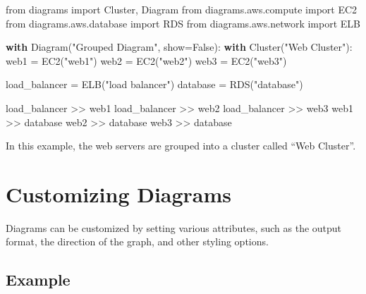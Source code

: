 \documentclass[
  letterpaper,
  DIV=11,
  numbers=noendperiod]{scrreprt}
\newenvironment{Shaded}{\begin{snugshade}}{\end{snugshade}}
\newcommand{\ControlFlowTok}[1]{\textcolor[rgb]{0.00,0.23,0.31}{\textbf{#1}}}
\newcommand{\ImportTok}[1]{\textcolor[rgb]{0.00,0.46,0.62}{#1}}
\newcommand{\NormalTok}[1]{\textcolor[rgb]{0.00,0.23,0.31}{#1}}
\newcommand{\OperatorTok}[1]{\textcolor[rgb]{0.37,0.37,0.37}{#1}}
\newcommand{\StringTok}[1]{\textcolor[rgb]{0.13,0.47,0.30}{#1}}
\newcommand{\VariableTok}[1]{\textcolor[rgb]{0.07,0.07,0.07}{#1}}
\begin{document}
\begin{Shaded}
\begin{Highlighting}[]
\ImportTok{from}\NormalTok{ diagrams }\ImportTok{import}\NormalTok{ Cluster, Diagram}
\ImportTok{from}\NormalTok{ diagrams.aws.compute }\ImportTok{import}\NormalTok{ EC2}
\ImportTok{from}\NormalTok{ diagrams.aws.database }\ImportTok{import}\NormalTok{ RDS}
\ImportTok{from}\NormalTok{ diagrams.aws.network }\ImportTok{import}\NormalTok{ ELB}

\ControlFlowTok{with}\NormalTok{ Diagram(}\StringTok{"Grouped Diagram"}\NormalTok{, show}\OperatorTok{=}\VariableTok{False}\NormalTok{):}
    \ControlFlowTok{with}\NormalTok{ Cluster(}\StringTok{"Web Cluster"}\NormalTok{):}
\NormalTok{        web1 }\OperatorTok{=}\NormalTok{ EC2(}\StringTok{"web1"}\NormalTok{)}
\NormalTok{        web2 }\OperatorTok{=}\NormalTok{ EC2(}\StringTok{"web2"}\NormalTok{)}
\NormalTok{        web3 }\OperatorTok{=}\NormalTok{ EC2(}\StringTok{"web3"}\NormalTok{)}
        
\NormalTok{    load\_balancer }\OperatorTok{=}\NormalTok{ ELB(}\StringTok{"load balancer"}\NormalTok{)}
\NormalTok{    database }\OperatorTok{=}\NormalTok{ RDS(}\StringTok{"database"}\NormalTok{)}

\NormalTok{    load\_balancer }\OperatorTok{\textgreater{}\textgreater{}}\NormalTok{ web1}
\NormalTok{    load\_balancer }\OperatorTok{\textgreater{}\textgreater{}}\NormalTok{ web2}
\NormalTok{    load\_balancer }\OperatorTok{\textgreater{}\textgreater{}}\NormalTok{ web3}
\NormalTok{    web1 }\OperatorTok{\textgreater{}\textgreater{}}\NormalTok{ database}
\NormalTok{    web2 }\OperatorTok{\textgreater{}\textgreater{}}\NormalTok{ database}
\NormalTok{    web3 }\OperatorTok{\textgreater{}\textgreater{}}\NormalTok{ database}
\end{Highlighting}
\end{Shaded}

In this example, the web servers are grouped into a cluster called ``Web
Cluster''.

\section{Customizing Diagrams}\label{customizing-diagrams-1}

Diagrams can be customized by setting various attributes, such as the
output format, the direction of the graph, and other styling options.

\subsection{Example}\label{example-39}
\end{document}
